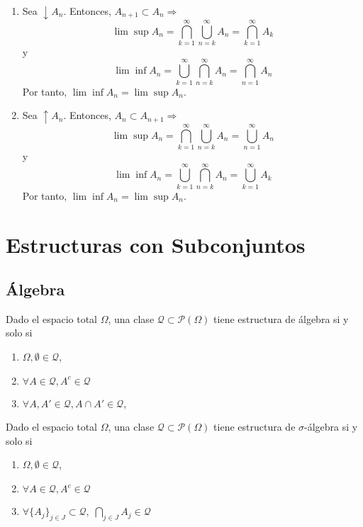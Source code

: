 \begin{dem}
  \begin{enumerate}[label=(\roman*)]
    \item Sea $\downarrow A_{n}$. Entonces, $A_{n+1} \subset A_{n} \Rightarrow$
      \[
         \lim \sup A_n = \bigcap_{k=1}^{\infty} \bigcup_{n=k}^{\infty} A_{n} = \bigcap_{k = 1}^{\infty} A_{k}
      \]
      y
      \[
        \lim \inf A_n = \bigcup_{k=1}^{\infty} \bigcap_{n=k}^{\infty} A_{n} = \bigcap_{n = 1}^{\infty} A_{n}
      \]
      Por tanto, $\lim \inf A_n  = \lim \sup A_n$.
    \item Sea $\uparrow A_{n}$. Entonces, $A_{n} \subset A_{n + 1} \Rightarrow$
      \[
         \lim \sup A_n = \bigcap_{k=1}^{\infty} \bigcup_{n=k}^{\infty} A_{n} = \bigcup_{n = 1}^{\infty} A_{n}
      \]
      y
      \[
        \lim \inf A_n = \bigcup_{k=1}^{\infty} \bigcap_{n=k}^{\infty} A_{n} = \bigcup_{k = 1}^{\infty} A_{k}
      \]
      Por tanto, $\lim \inf A_n  = \lim \sup A_n$.
 
  \end{enumerate}
\end{dem}

\section{Estructuras con Subconjuntos}

\subsection{Álgebra}

\begin{defn}[Álgebra]
  Dado el espacio total $\Omega$, una clase $\mathcal{Q} \subset \mathcal{P}(\Omega)$ tiene estructura de álgebra si y solo si
  \begin{enumerate}[label=(\roman*)]
    \item $\Omega, \emptyset \in \mathcal{Q}$,
    \item $\forall A \in \mathcal{Q}, A^{c} \in \mathcal{Q}$
    \item $\forall A, A' \in \mathcal{Q}, A \cap A' \in \mathcal{Q}$,
  \end{enumerate}
\end{defn}

\begin{defn}
  Dado el espacio total $\Omega$, una clase $\mathcal{Q} \subset \mathcal{P}(\Omega)$ tiene estructura de $\sigma$-álgebra si y solo si
  \begin{enumerate}[label=(\roman*)]
    \item $\Omega, \emptyset \in \mathcal{Q}$,
    \item $\forall A \in \mathcal{Q}, A^{c} \in \mathcal{Q}$
    \item $\forall \{ A_{j} \}_{j \in J} \subset \mathcal{Q}, \; \bigcap_{j \in J} A_{j} \in \mathcal{Q}$
  \end{enumerate}
\end{defn}

